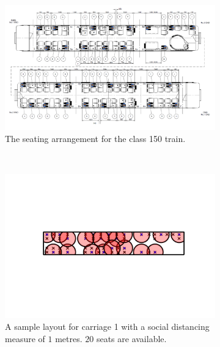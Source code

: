 \documentclass[11pt,a4paper]{article}
\begin{document}
\begin{itemize}
\begin{figure}[ht!]
\centering

\vspace{-1.5cm}

\begin{subfigure}[h]{0.95\linewidth}
\centering
\includegraphics[scale = 0.6]{floorplan150.png}
\caption{The seating arrangement for the class 150 train.}
\label{Reference}
\end{subfigure}
~
\begin{subfigure}[h]{0.49\linewidth}
\centering
\includegraphics[width = \linewidth]{class150_first_car_1m.png}
\caption{A sample layout for carriage 1 with a social distancing measure of $1$ metres. $20$ seats are available.}
\label{OneMetre1}
\end{subfigure}
~
\begin{subfigure}[h]{0.490\linewidth}
\centering

\end{subfigure}
\end{figure}
\end{itemize}
\end{document}
